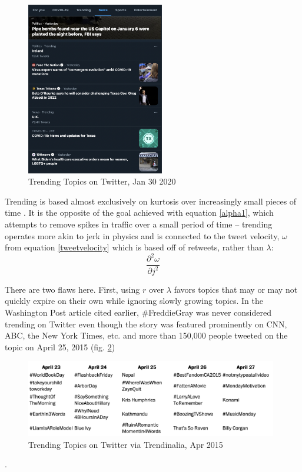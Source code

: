 \documentclass[preprint,review,12pt]{elsarticle}
\begin{document}
\begin{figure}[htp]
    \centering
    \includegraphics[width=6cm]{Twitter Trending.png}
    \caption{Trending Topics on Twitter, Jan 30 2020}
    \label{img:Trending Topics}
\end{figure}


Trending is based almost exclusively on kurtosis over increasingly small pieces of time \citep{dewey2015freddie,lotan2015freddie}. It is the opposite of the goal achieved with equation \ref{alpha1}, which attempts to remove spikes in traffic over a small period of time -- trending operates more akin to jerk in physics and is connected to the tweet velocity, $\omega$ from equation \ref{tweetvelocity} which is based off of retweets, rather than $\lambda$: 
\[
    \frac{\partial^2 \omega}{\partial j^2}
\]

There are two flaws here. First, using $r$ over $\lambda$ favors topics that may or may not quickly expire on their own while ignoring slowly growing topics. In the Washington Post article cited earlier, \#FreddieGray was never considered trending on Twitter even though the story was featured prominently on CNN, ABC, the New York Times, etc. and more than 150,000 people tweeted on the topic on April 25, 2015 (fig. \ref{img:Trendinalia 2015})
\begin{figure}[htp]
    \centering
    \includegraphics[width=11cm]{Trendinalia Apr, 2015.png}
    \caption{Trending Topics on Twitter via Trendinalia, Apr 2015}
    \label{img:Trendinalia 2015}
\end{figure}
. 
\end{document}
